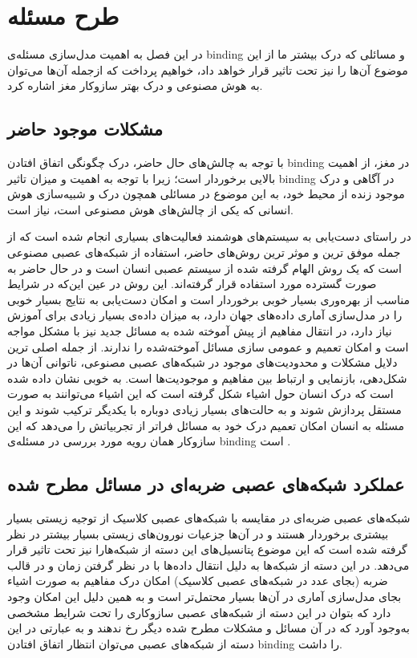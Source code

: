 \documentclass[12pt]{report}
\begin{document}
	
	\chapter{طرح مسئله}
	
	در این فصل به اهمیت مدل‌سازی مسئله‌ی \gls{binding} و مسائلی که درک بیشتر ما از این موضوع آن‌ها را نیز تحت تاثیر قرار خواهد داد، خواهیم پرداخت که از‌جمله آن‌ها می‌توان به هوش مصنوعی و درک بهتر ساز‌وکار مغز اشاره کرد.
	
	\section{مشکلات موجود حاضر}
	
	با توجه به چالش‌های حال حاضر، درک چگونگی اتفاق افتادن \gls{binding} در مغز، از اهمیت بالایی برخوردار است؛ زیرا با توجه به اهمیت و میزان تاثیر \gls{binding} در آگاهی و درک موجود زنده از محیط خود، به این موضوع در مسائلی همچون درک و شبیه‌سازی هوش انسانی که یکی از چالش‌های هوش مصنوعی است، نیاز است.
	
	در راستای دست‌یابی به سیستم‌های هوشمند فعالیت‌های بسیاری انجام شده است که از جمله‌ موفق ترین و موثر ترین روش‌های حاضر، استفاده از شبکه‌های عصبی مصنوعی است که یک روش الهام گرفته شده از سیستم عصبی انسان است و در حال حاضر به صورت گسترده مورد استفاده قرار گرفته‌اند. این روش در  عین این‌که در شرایط مناسب از بهره‌وری بسیار خوبی برخوردار است و امکان دست‌یابی به نتایج بسیار خوبی را در مدل‌سازی آماری داده‌های جهان دارد، به میزان داده‌ی بسیار زیادی برای آموزش نیاز دارد، در انتقال مفاهیم از پیش آموخته شده به مسائل جدید نیز با مشکل مواجه است و امکان تعمیم و عمومی سازی مسائل آموخته‌شده را ندارند.
	از جمله اصلی ترین دلایل مشکلات و محدودیت‌های موجود در شبکه‌های عصبی مصنوعی، ناتوانی آن‌ها در شکل‌دهی، بازنمایی و ارتباط بین مفاهیم و موجودیت‌ها است. به خوبی نشان داده شده است که درک انسان حول اشیاء شکل گرفته است که این اشیاء می‌توانند به صورت مستقل پردازش شوند و به حالت‌های بسیار زیادی دوباره با یکدیگر ترکیب شوند و این مسئله به انسان امکان تعمیم درک خود به مسائل فراتر از تجربیاتش را می‌دهد که این ساز‌وکار همان رویه مورد بررسی در مسئله‌ی \gls{binding} است
	\cite{greff2020binding}.
	
	\section{عملکرد شبکه‌های عصبی ضربه‌ای در مسائل مطرح شده}
	شبکه‌های عصبی ضربه‌ای در مقایسه با شبکه‌های عصبی کلاسیک از توجیه زیستی بسیار بیشتری برخوردار هستند و در آن‌ها جزعیات نورون‌های زیستی بسیار بیشتر در نظر گرفته شده است که این موضوع پتانسیل‌های این دسته از شبکه‌هارا نیز تحت تاثیر قرار می‌دهد. در این دسته از شبکه‌ها به دلیل انتقال داده‌ها با در نظر گرفتن زمان و در قالب ضربه (بجای عدد در شبکه‌‌های عصبی کلاسیک) امکان درک مفاهیم به صورت اشیاء بجای مدل‌سازی آماری در آن‌ها بسیار محتمل‌تر است و به همین دلیل این امکان وجود دارد که بتوان در این دسته از شبکه‌های عصبی سازوکاری را تحت شرایط مشخصی به‌وجود آورد که در آن مسائل و مشکلات مطرح شده دیگر رخ ندهند و به عبارتی در این دسته از شبکه‌های عصبی می‌توان انتظار اتفاق افتادن \gls{binding} را داشت.
	
\end{document}
